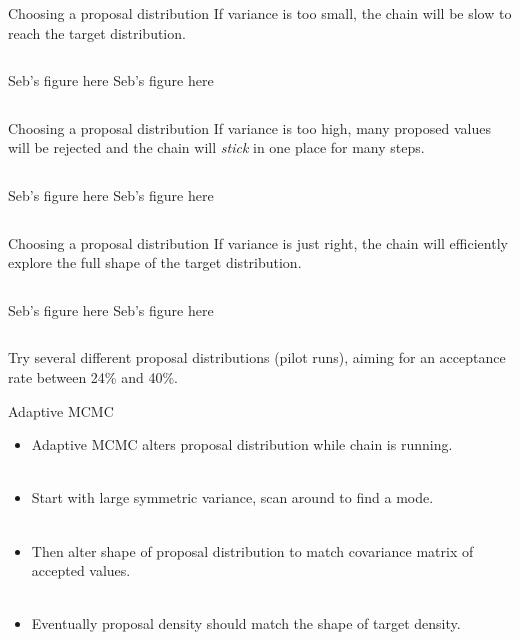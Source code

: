 \documentclass[compress]{beamer}
\begin{document}
\begin{frame}[label=sec-8-3]{Choosing a proposal distribution}
If \alert {variance is too small}, the chain will be slow to reach the target distribution.
\begin{columns}[c] 
Seb's figure here 
Seb's figure here 
\end{columns}  
\end{frame}

\begin{frame}[label=sec-8-4]{Choosing a proposal distribution}
If \alert{variance is too high}, many proposed values will be rejected and the chain will \textit{stick} in one place for many steps.
\begin{columns}[c] 
Seb's figure here 
Seb's figure here 
\end{columns}  
\end{frame}

\begin{frame}[label=sec-8-5]{Choosing a proposal distribution}
If \alert{variance is just right}, the chain will efficiently explore the full shape of the target distribution.
\begin{columns}[c] 
Seb's figure here 
Seb's figure here 
\end{columns} 
Try several different proposal distributions (\alert{pilot runs}), aiming for an acceptance rate between 24\%  and 40\%. 
\end{frame}

\begin{frame}[label=sec-8-6]{Adaptive MCMC}
\begin{itemize}
\item \alert{Adaptive MCMC} alters proposal distribution while chain is running. \\~\\
\item Start with large symmetric variance, scan around to find a mode. \\~\\
\item Then alter shape of proposal distribution to match covariance matrix of accepted values.\\~\\
\item Eventually proposal density should match the shape of target density.\\~\\
\end{itemize}
\end{frame}
\end{document}
